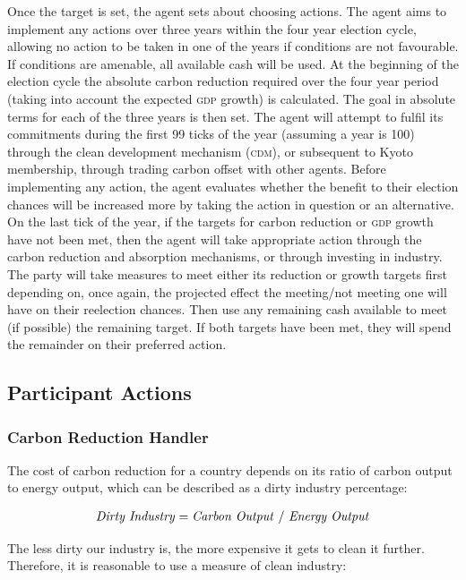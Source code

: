 Once the target is set, the agent sets about choosing actions. The agent aims to implement any actions over three years within the four year election cycle, allowing no action to be taken in one of the years if conditions are not favourable. If conditions are amenable, all available cash will be used. At the beginning of the election cycle the absolute carbon reduction required over the four year period (taking into account the expected \textsc{gdp} growth) is calculated. The goal in absolute terms for each of the three years is then set. The agent will attempt to fulfil its commitments during the first 99 ticks of the year (assuming a year is 100) through the clean development mechanism (\textsc{cdm}), or subsequent to Kyoto membership, through trading carbon offset with other agents. Before implementing any action, the agent evaluates whether the benefit to their election chances will be increased more by taking the action in question or an alternative. On the last tick of the year, if the targets for carbon reduction or \textsc{gdp} growth have not been met, then the agent will take appropriate action through the carbon reduction and absorption mechanisms, or through investing in industry. The party will take measures to meet either its reduction or growth targets first depending on, once again, the projected effect the meeting/not meeting one will have on their reelection chances. Then use any remaining cash available to meet (if possible) the remaining target. If both targets have been met, they will spend the remainder on their preferred action.

\subsection{Participant Actions}

\subsubsection{Carbon Reduction Handler}

The cost of carbon reduction for a country depends on its ratio of carbon output to energy output, which can be described as a dirty industry percentage:

\begin{align*}
\text{\emph{Dirty Industry}} = \text{\emph{Carbon Output}}~/~\text{\emph{Energy Output}}
\end{align*}

The less dirty our industry is, the more expensive it gets to clean it further. Therefore, it is reasonable to use a measure of clean industry:

